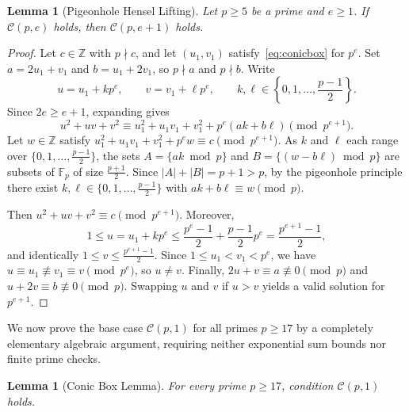 \documentclass[11pt,reqno]{amsart}
\newtheorem{lemma}[theorem]{Lemma}
\theoremstyle{remark}
\newcommand{\Z}{\mathbb{Z}}
\newcommand{\F}{\mathbb{F}}
\begin{document}
\begin{lemma}[Pigeonhole Hensel Lifting]\label{lem:lift}
Let $p \ge 5$ be a prime and $e \ge 1$. If $\mathcal{C}(p, e)$ holds, then $\mathcal{C}(p, e+1)$ holds.
\end{lemma}

\begin{proof}
Let $c \in \Z$ with $p \nmid c$, and let $(u_1, v_1)$ satisfy~\eqref{eq:conicbox} for $p^e$. Set $a = 2u_1 + v_1$ and $b = u_1 + 2v_1$, so $p \nmid a$ and $p \nmid b$. Write
\[
u = u_1 + k p^e, \qquad v = v_1 + \ell p^e, \qquad k, \ell \in \left\{0, 1, \dots, \frac{p-1}{2}\right\}.
\]
Since $2e \ge e + 1$, expanding gives
\[
u^2 + uv + v^2 \equiv u_1^2 + u_1 v_1 + v_1^2 + p^e(a k + b \ell) \pmod{p^{e+1}}.
\]
Let $w \in \Z$ satisfy $u_1^2 + u_1 v_1 + v_1^2 + p^e w \equiv c \pmod{p^{e+1}}$. As $k$ and $\ell$ each range over $\{0, 1, \dots, \frac{p-1}{2}\}$, the sets $A = \{ak \bmod p\}$ and $B = \{(w - b\ell) \bmod p\}$ are subsets of $\F_p$ of size $\frac{p+1}{2}$. Since $|A| + |B| = p + 1 > p$, by the pigeonhole principle there exist $k, \ell \in \{0, 1, \dots, \frac{p-1}{2}\}$ with $ak + b\ell \equiv w \pmod p$.

Then $u^2 + uv + v^2 \equiv c \pmod{p^{e+1}}$. Moreover,
\[
1 \le u = u_1 + k p^e \le \frac{p^e - 1}{2} + \frac{p - 1}{2} p^e = \frac{p^{e+1} - 1}{2},
\]
and identically $1 \le v \le \frac{p^{e+1} - 1}{2}$. Since $1 \le u_1 < v_1 < p^e$, we have $u \equiv u_1 \not\equiv v_1 \equiv v \pmod{p^e}$, so $u \neq v$. Finally, $2u + v \equiv a \not\equiv 0 \pmod p$ and $u + 2v \equiv b \not\equiv 0 \pmod p$. Swapping $u$ and $v$ if $u > v$ yields a valid solution for $p^{e+1}$.
\end{proof}

We now prove the base case $\mathcal{C}(p, 1)$ for all primes $p \ge 17$ by a completely elementary algebraic argument, requiring neither exponential sum bounds nor finite prime checks.

\begin{lemma}[Conic Box Lemma]\label{lem:conicbox}
For every prime $p \ge 17$, condition $\mathcal{C}(p, 1)$ holds.
\end{lemma}
\end{document}
